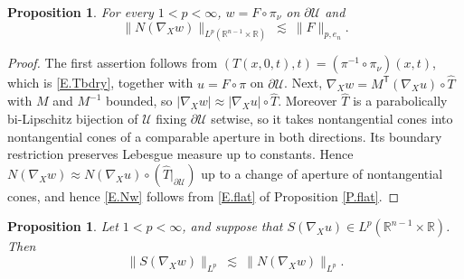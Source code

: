 \documentclass[12pt,leqno]{amsart}
\numberwithin{equation}{section}
\newcommand{\R}{\mathbb R}
\newcommand{\abs}[1]{\left\vert#1\right\vert}
\newcommand{\br}[1]{\left(#1\right)}
\newcommand{\pd}{\partial}
\newcommand{\Uc}{\mathcal U}
\theoremstyle{plain}
\newtheorem{proposition}[equation]{Proposition}
\theoremstyle{remark}
\begin{document}
\begin{proposition}\label{P.Nw}
For every $1<p<\infty$, $w=F\circ\pi_\nu$ on $\pd\Uc$ and
\begin{equation}\label{E.Nw}
  \big\|N(\nabla_Xw)\big\|_{L^p(\R^{n-1}\times\R)}\ \lesssim\ \|F\|_{p,e_n} .
\end{equation}
\end{proposition}

\begin{proof}
The first assertion follows from
$\br{T(x,0,t),t}=\br{\pi^{-1}\circ\pi_\nu}(x,t)$, which is
\eqref{E.Tbdry}, together with $u=F\circ\pi$ on $\pd\Uc$. Next,
$\nabla_Xw=M^{\mathsf T}(\nabla_Xu)\circ\widehat T$
with $M$ and $M^{-1}$ bounded, so
$\abs{\nabla_Xw}\approx\abs{\nabla_Xu}\circ\widehat T$. Moreover $\widehat T$ is a parabolically
bi-Lipschitz bijection of $\Uc$ fixing $\pd\Uc$
setwise, so it takes nontangential cones into nontangential cones of a
comparable aperture in both directions. Its boundary restriction preserves
Lebesgue measure up to constants. Hence
$N(\nabla_Xw)\approx N(\nabla_Xu)\circ\br{\widehat T|_{\pd\Uc}}$ up to a change of
aperture of nontangential cones, and hence \eqref{E.Nw} follows from
\eqref{E.flat} of Proposition \ref{P.flat}.
\end{proof}

\begin{proposition}\label{P.Sw}
Let $1<p<\infty$, and suppose that
$S(\nabla_Xu)\in L^p(\R^{n-1}\times\R)$. Then
\begin{equation}\label{E.SNpull}
  \big\|S(\nabla_Xw)\big\|_{L^p}
  \ \lesssim\ \big\|N(\nabla_Xw)\big\|_{L^p} .
\end{equation}
\end{proposition}
\end{document}
